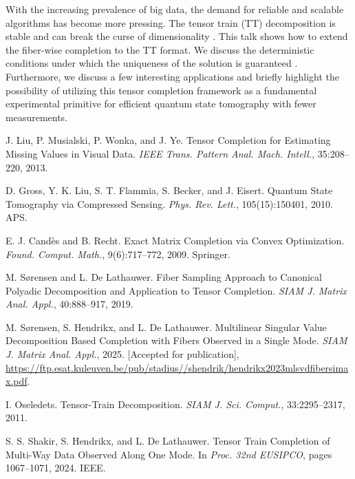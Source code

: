 \documentclass[ILAS2025-program.tex]{subfiles}
\begin{document}
\begin{ilasabstract}
\begin{bibunit}
With the increasing prevalence of big data, the demand for reliable and scalable algorithms has become more pressing. The tensor train (TT) decomposition is stable and can break the curse of dimensionality \cite{oseledets2010tensortrain}. This talk shows how to extend the fiber-wise completion to the TT format. We discuss the deterministic conditions under which the uniqueness of the solution is guaranteed \cite{stijn2023mlsvdfsj, shakir2024ttfw}. Furthermore, we discuss a few interesting applications and briefly highlight the possibility of utilizing this tensor completion framework as a fundamental experimental primitive for efficient quantum state tomography with fewer measurements.

\begin{thebibliography}{7}
 J. Liu, P. Musialski, P. Wonka, and J. Ye. Tensor Completion for Estimating Missing Values in Visual Data. \textit{IEEE Trans. Pattern Anal. Mach. Intell.}, 35:208--220, 2013.

 D. Gross, Y. K. Liu, S. T. Flammia, S. Becker, and J. Eisert. Quantum State Tomography via Compressed Sensing. \textit{Phys. Rev. Lett.}, 105(15):150401, 2010. APS.

 E. J. Cand{\`e}s and B. Recht. Exact Matrix Completion via Convex Optimization. \textit{Found. Comput. Math.}, 9(6):717--772, 2009. Springer.


 M. S{\o}rensen and L. De Lathauwer. Fiber Sampling Approach to Canonical Polyadic Decomposition and Application to Tensor Completion. \textit{SIAM J. Matrix Anal. Appl.}, 40:888--917, 2019.

 M. S{\o}rensen, S. Hendrikx, and L. De Lathauwer. Multilinear Singular Value Decomposition Based Completion with Fibers Observed in a Single Mode. \textit{SIAM J. Matrix Anal. Appl.}, 2025. [Accepted for publication], \url{https://ftp.esat.kuleuven.be/pub/stadius//shendrik/hendrikx2023mlsvdfibersimax.pdf}.

 I. Oseledets. Tensor-Train Decomposition. \textit{SIAM J. Sci. Comput.}, 33:2295--2317, 2011.

 S. S. Shakir, S. Hendrikx, and L. De Lathauwer. Tensor Train Completion of Multi-Way Data Observed Along One Mode. In \textit{Proc. 32nd EUSIPCO}, pages 1067--1071, 2024. IEEE.
\end{thebibliography}
        \end{bibunit}
        
\end{ilasabstract}
    
\end{document}
